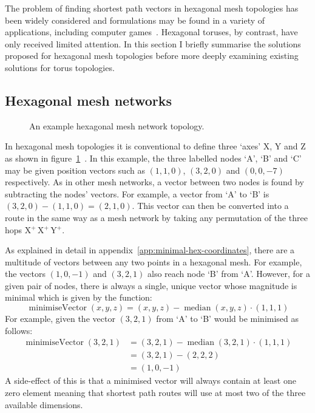 		The problem of finding shortest path vectors in hexagonal mesh topologies
		has been widely considered and formulations may be found in a variety of
		applications, including computer games~\cite{patel15}. Hexagonal
		toruses, by contrast, have only received limited attention. In this section I
		briefly summarise the solutions proposed for hexagonal mesh topologies
		before more deeply examining existing solutions for torus topologies.
		
		\subsection{Hexagonal mesh networks}
			
			\begin{figure}
				\center
				\caption{An example hexagonal mesh network topology.}
				\label{fig:hex-mesh-topology-coordinates}
			\end{figure}
			
			In hexagonal mesh topologies it is conventional to define three `axes' X,
			Y and Z as shown in
			figure~\ref{fig:hex-mesh-topology-coordinates}~\cite{patel15}. In this
			example, the three labelled nodes `A', `B' and `C' may be given position
			vectors such as $(1, 1, 0)$, $(3, 2, 0)$ and $(0, 0, -7)$ respectively.
			As in other mesh networks, a vector between two nodes is found by
			subtracting the nodes' vectors. For example, a vector from `A' to `B' is
			$(3, 2, 0) - (1, 1, 0) = (2, 1, 0)$. This vector can then be converted
			into a route in the same way as a mesh network by taking any permutation
			of the three hops  X$^+\,$X$^+\,$Y$^+$.
			
			As explained in detail in appendix~\ref{app:minimal-hex-coordinates},
			there are a multitude of vectors between any two points in a hexagonal
			mesh. For example, the vectors $(1, 0, -1)$ and $(3, 2, 1)$ also reach
			node `B' from `A'. However, for a given pair of nodes, there is always a
			single, unique vector whose magnitude is minimal which is given by the
			function:
			\begin{equation*}
				\operatorname{minimiseVector}(x,y,z) =
					(x,y,z) - \operatorname{median}(x,y,z) \cdot (1,1,1)
			\end{equation*}
			For example, given the vector $(3, 2, 1)$ from `A' to `B' would be
			minimised as follows:
			\begin{align*}
				\operatorname{minimiseVector}(3,2,1) &=
					(3,2,1) - \operatorname{median}(3,2,1) \cdot (1,1,1) \\
				&=
					(3,2,1) - (2,2,2) \\
				&=
					(1,0,-1)
			\end{align*}
			A side-effect of this is that a minimised vector will always contain at
			least one zero element meaning that shortest path routes will use at most
			two of the three available dimensions.
		
